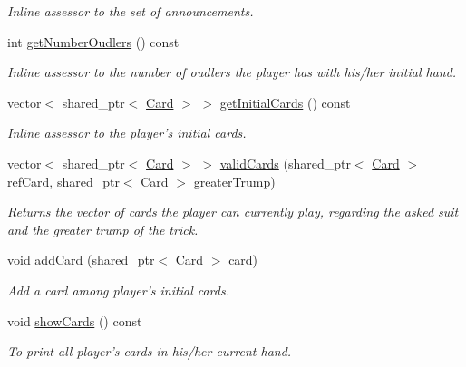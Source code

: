 \begin{DoxyCompactItemize}
\begin{DoxyCompactList}\small\item\em \-Inline assessor to the set of announcements. \end{DoxyCompactList}\item 
\hypertarget{classPlayer_a4dc51cf2a773556eb26f3d47c4274b0a}{int \hyperlink{classPlayer_a4dc51cf2a773556eb26f3d47c4274b0a}{get\-Number\-Oudlers} () const }\label{classPlayer_a4dc51cf2a773556eb26f3d47c4274b0a}

\begin{DoxyCompactList}\small\item\em \-Inline assessor to the number of oudlers the player has with his/her initial hand. \end{DoxyCompactList}\item 
\hypertarget{classPlayer_aab2cfa2ce2e7a3903ff99ac5c7ef8db6}{vector$<$ shared\-\_\-ptr$<$ \hyperlink{classCard}{\-Card} $>$ $>$ \hyperlink{classPlayer_aab2cfa2ce2e7a3903ff99ac5c7ef8db6}{get\-Initial\-Cards} () const }\label{classPlayer_aab2cfa2ce2e7a3903ff99ac5c7ef8db6}

\begin{DoxyCompactList}\small\item\em \-Inline assessor to the player's initial cards. \end{DoxyCompactList}\item 
vector$<$ shared\-\_\-ptr$<$ \hyperlink{classCard}{\-Card} $>$ $>$ \hyperlink{classPlayer_ab89873d894a8e4e7e67a16feba4bf116}{valid\-Cards} (shared\-\_\-ptr$<$ \hyperlink{classCard}{\-Card} $>$ ref\-Card, shared\-\_\-ptr$<$ \hyperlink{classCard}{\-Card} $>$ greater\-Trump)
\begin{DoxyCompactList}\small\item\em \-Returns the vector of cards the player can currently play, regarding the asked suit and the greater trump of the trick. \end{DoxyCompactList}\item 
void \hyperlink{classPlayer_a7c7b8325247c91ef255ca493de9f35eb}{add\-Card} (shared\-\_\-ptr$<$ \hyperlink{classCard}{\-Card} $>$ card)
\begin{DoxyCompactList}\small\item\em \-Add a card among player's initial cards. \end{DoxyCompactList}\item 
\hypertarget{classPlayer_a5216f487067dd79371af457f4b8f1769}{void \hyperlink{classPlayer_a5216f487067dd79371af457f4b8f1769}{show\-Cards} () const }\label{classPlayer_a5216f487067dd79371af457f4b8f1769}

\begin{DoxyCompactList}\small\item\em \-To print all player's cards in his/her current hand. \end{DoxyCompactList}\end{DoxyCompactItemize}
